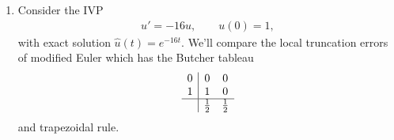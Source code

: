 \documentclass[reqno, answers]{exam}
\begin{document}
\begin{enumerate}
\begin{solution}
\begin{parts}
Given: $f(t,u) = -2tu$, $u_0 = 2$, $h = 0.2$, $t_0 = 0$, $t_1 = 0.2$

First, compute $f(t_0, u_0) = f(0, 2) = -2(0)(2) = 0$

$$u_1 = 2 + \frac{0.2}{2}[0 + (-2(0.2)u_1)]$$

$$u_1 = 2 + 0.1(-0.4u_1)$$

$$u_1 = 2 - 0.04u_1$$

$$u_1 + 0.04u_1 = 2$$

$$1.04u_1 = 2$$

$$u_1 = \frac{2}{1.04} = \frac{200}{104} = \frac{50}{26} = \frac{25}{13} \approx 1.923$$

\end{parts}

\end{solution}

  \item Consider the IVP 
  \begin{align*}
    u' = -16u, \hspace{2em}
    u(0) = 1,
  \end{align*}
  with exact solution $\widehat{u}(t) = e^{-16t}$. We'll compare the local truncation errors of modified Euler which has the Butcher tableau 
  \begin{equation*}
  \begin{array}{c|cc}
  0 & 0 & 0 \\
  1 & 1 & 0 \\
  \hline
  & \frac{1}{2} & \frac{1}{2}
  \end{array}
  \end{equation*}
  and trapezoidal rule.
\end{enumerate}
\end{document}
